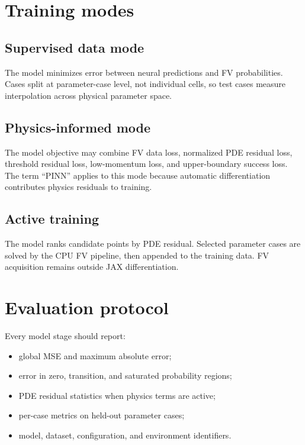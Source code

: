\documentclass[11pt]{article}
\begin{document}
\section{Training modes}

\subsection{Supervised data mode}

The model minimizes error between neural predictions and FV probabilities.
Cases split at parameter-case level, not individual cells, so test cases
measure interpolation across physical parameter space.

\subsection{Physics-informed mode}

The model objective may combine FV data loss, normalized PDE residual loss,
threshold residual loss, low-momentum loss, and upper-boundary success loss.
The term ``PINN'' applies to this mode because automatic differentiation
contributes physics residuals to training.

\subsection{Active training}

The model ranks candidate points by PDE residual.  Selected parameter cases
are solved by the CPU FV pipeline, then appended to the training data.  FV
acquisition remains outside JAX differentiation.

\section{Evaluation protocol}

Every model stage should report:
\begin{itemize}[nosep]
  \item global MSE and maximum absolute error;
  \item error in zero, transition, and saturated probability regions;
  \item PDE residual statistics when physics terms are active;
  \item per-case metrics on held-out parameter cases;
  \item model, dataset, configuration, and environment identifiers.
\end{itemize}
\end{document}
